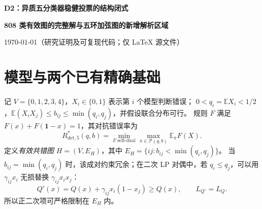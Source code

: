 \documentclass[11pt,a4paper]{ctexart}
\theoremstyle{remark}\newtheorem{remark}[theorem]{备注}
\newcommand{\Rstar}{R^*_{\mathrm{det},5}}
\newcommand{\bx}{\mathbf{1}}
\begin{document}
\begin{center}
{\LARGE\bfseries D2：异质五分类器稳健投票的结构闭式}\par\vspace{0.5em}
{\large\bfseries 808 类有效图的完整解与五环加弦图的新增解析区域}\par\vspace{0.4em}
\today\quad（研究证明及可复现代码；仅 LaTeX 源文件）
\end{center}
\begin{abstract}
研究具有边际错误率 $q_i$ 和成对共错上界 $b_{ij}$ 的确定性 self-dual 投票。
在复核上一轮研究成果的基础上，给出两个层次的严格结果：
（1）四变量统一混合对偶只有 24 个有理顶点，从而 $K=4$ 的确定性值、共同对称对抗质量相等，并形成 12 项闭式；利用割点拼接，可以使 $K=5$ 的 1024 种有标号有效约束图中 808 种获得完整显式公式。
（2）\emph{本轮新增}：对尚未整体解决的“五环加一条弦”六边有效图，证明了一个覆盖异质边际、且允许 $\sum_iq_i>1$ 的显式闭式区域。
新证明直接构造对所有确定性 self-dual 规则同时有效的联合错误分布，不依赖随机抽样。
仍余下的五顶点二连通图之通用实系数对偶完整性\textbf{没有被证明}；特别是本轮五环加弦公式含有不可随意删除的附加参数条件。
\end{abstract}

\section{模型与两个已有精确基础}
记 $V=\{0,1,2,3,4\}$，$X_i\in\{0,1\}$ 表示第 $i$ 个模型判断错误；
$0<q_i=\mathbb E X_i<1/2$，$\mathbb E(X_iX_j)\le b_{ij}\le\min(q_i,q_j)$，并假设联合分布可行。
规则 $F$ 满足 $F(x)+F(\bx-x)=1$，其对抗错误率为
\[
\Rstar(q,b)=\min_{F\;\mathrm{self\mbox{-}dual}}
\max_{\pi\in\mathcal P(q,b)}\mathbb E_\pi F(X).
\]
定义\emph{有效共错图} $H=(V,E_H)$，其中
$E_H=\{ij:b_{ij}<\min(q_i,q_j)\}$。
当 $b_{ij}=\min(q_i,q_j)$ 时，该成对约束冗余；在二次 LP 对偶中，若
$q_i\le q_j$，可以用 $\gamma_{ij}x_i$ 无损替换 $\gamma_{ij}x_ix_j$：
\[
Q'(x)=Q(x)+\gamma_{ij}x_i(1-x_j)\ge Q(x),\qquad L_{Q'}=L_Q.
\]
所以正二次项可严格限制在 $E_H$ 内。
\end{document}
